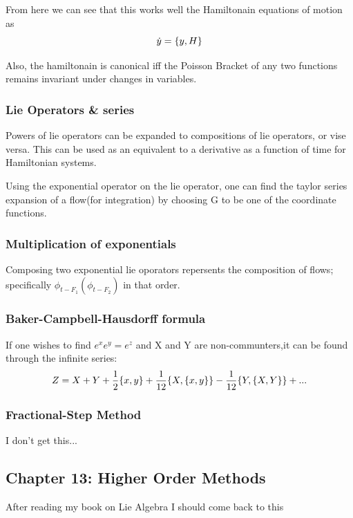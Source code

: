 From here we can see that this works well the Hamiltonain equations of motion as
\[
\dot{y} = \pb{y}{H}
\]

Also, the hamiltonain is canonical iff the Poisson Bracket of any two functions remains invariant under changes in variables.

\subsubsection{Lie Operators \& series}
Powers of lie operators can be expanded to compositions of lie operators, or vise versa. This can be used as an equivalent to a derivative as a function of time for Hamiltonian systems.

Using the exponential operator on the lie operator, one can find the taylor series expansion of a flow(for integration) by choosing G to be one of the coordinate functions.
\subsubsection{Multiplication of exponentials}
Composing two exponential lie oporators repersents the composition of flows; specifically $\phi_{t-F_1}(\phi_{t-F_2})$ in that order.

\subsubsection{Baker-Campbell-Hausdorff formula}
If one wishes to find $e^xe^y=e^z$ and X and Y are non-communters,it can be found through the infinite series:
\[
Z = X + Y + \frac{1}{2} \pb{x}{y} + \frac{1}{12} \pb{X}{\pb{x}{y}} - \frac{1}{12} \pb{Y}{\pb{X}{Y}} + ...
  \]
\subsubsection{Fractional-Step Method}
I don't get this...

\subsection{Chapter 13: Higher Order Methods}

After reading my book on Lie Algebra I should come back to this
